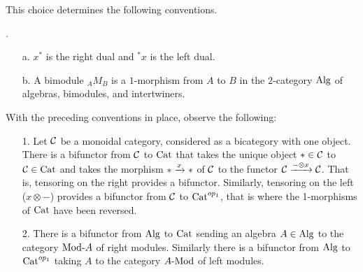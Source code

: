\documentclass{amsart}
\begin{document}
This choice determines the following conventions.
\begin{definition}.
\begin{itemize}
\item[a.] $x^*$ is the right dual and ${}^*x$ is the left dual.
\item[b.] A bimodule ${}_A M_B$ is a $1$-morphism from $A$ to $B$ in the $2$-category $\mathrm{Alg}$ of algebras, bimodules, and intertwiners.
\end{itemize}
\end{definition}

\noindent With the preceding conventions in place, observe the following:
\begin{itemize}
\item[1.] Let $\mathcal C$ be a monoidal category, considered as a bicategory with one object.  There is a bifunctor from $\mathcal C$ to $\mathrm{Cat}$ that takes the unique object $\ast \in \mathcal C$ to $\mathcal C \in \mathrm{Cat}$ and takes the morphism $\ast \xrightarrow{x} \ast$ of $\mathcal C$ to the functor $\mathcal C \xrightarrow{- \otimes x} \mathcal C$.  That is, tensoring on the right provides a bifunctor.  Similarly, tensoring on the left ($x \otimes -$) provides a bifunctor from $\mathcal C$ to $\mathrm{Cat}^{op_1}$, that is where the 1-morphisms of $\mathrm{Cat}$ have been reversed.
\item[2.] There is a bifunctor from $\mathrm{Alg}$ to $\mathrm{Cat}$ sending an algebra $A \in \mathrm{Alg}$ to the category $\Mod{}{A}$ of right modules.  Similarly there is a bifunctor from $\mathrm{Alg}$ to $\mathrm{Cat}^{op_1}$ taking $A$ to the category $\Mod{A}{}$ of left modules.  
\end{itemize}




\end{document}
